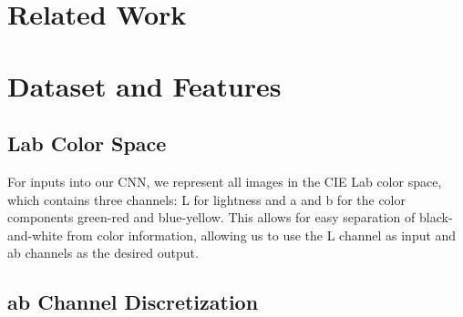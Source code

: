 \documentclass{article} %
\begin{document}
\section{Related Work}




\section{Dataset and Features}

\subsection{Lab Color Space}

For inputs into our CNN, we represent all images in the CIE Lab color space, which contains three channels: L for lightness and a and b for the color components green-red and blue-yellow. This allows for easy separation of black-and-white from color information, allowing us to use the L channel as input and ab channels as the desired output.\\

\subsection{ab Channel Discretization}
\end{document}
